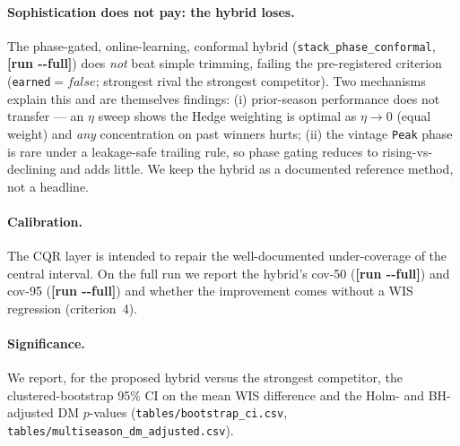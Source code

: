 \documentclass{article}
\providecommand{\msHybridWIS}{\textbf{[run -{}-full]}}
\providecommand{\msHybridCovFifty}{\textbf{[run -{}-full]}}
\providecommand{\msHybridCovNinetyfive}{\textbf{[run -{}-full]}}
\providecommand{\hybridStrongestRival}{the strongest competitor}
\providecommand{\hybridEarned}{false}
\begin{document}
\paragraph{Sophistication does not pay: the hybrid loses.} The phase-gated, online-learning,
conformal hybrid (\texttt{stack\_phase\_conformal}, \msHybridWIS{}) does \emph{not} beat simple
trimming, failing the pre-registered criterion (\texttt{earned}$=\hybridEarned$; strongest rival
\hybridStrongestRival{}). Two mechanisms explain this and are themselves findings: (i) prior-season
performance does not transfer --- an $\eta$ sweep shows the Hedge weighting is optimal as
$\eta\!\to\!0$ (equal weight) and \emph{any} concentration on past winners hurts; (ii) the vintage
\texttt{Peak} phase is rare under a leakage-safe trailing rule, so phase gating reduces to
rising-vs-declining and adds little. We keep the hybrid as a documented reference method, not a
headline.

\begin{table}[t]
\centering
\caption{Multi-season paired leaderboard: base models, ensembles, and hybrid ablations
(season-unweighted WIS on the common forecast mask; the winning combiner in bold). Generated from
\texttt{results/multiseason\_common\_summary.csv} on a \texttt{-{}-full} run; a quick run leaves a
placeholder so no provisional number is mistaken for a result.}
\label{tab:hybrid}
\end{table}

\paragraph{Calibration.} The CQR layer is intended to repair the well-documented under-coverage of
the central interval. On the full run we report the hybrid's cov-50 (\msHybridCovFifty{}) and
cov-95 (\msHybridCovNinetyfive{}) and whether the improvement comes without a WIS regression
(criterion~4).

\paragraph{Significance.} We report, for the proposed hybrid versus \hybridStrongestRival{}, the
clustered-bootstrap 95\% CI on the mean WIS difference and the Holm- and BH-adjusted DM $p$-values
(\texttt{tables/bootstrap\_ci.csv}, \texttt{tables/multiseason\_dm\_adjusted.csv}).
\end{document}
